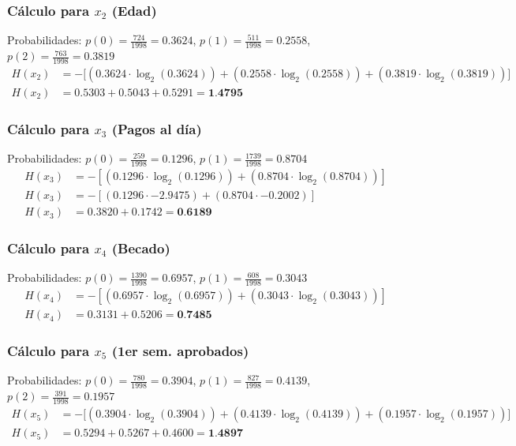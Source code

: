\documentclass[12pt,a4paper]{article}
\begin{document}
\subsubsection{Cálculo para $x_2$ (Edad)}
Probabilidades: $p(0) = \frac{724}{1998} = 0.3624$, $p(1) = \frac{511}{1998} = 0.2558$, $p(2) = \frac{763}{1998} = 0.3819$
\begin{align*}
    H(x_2) &= -\big[ (0.3624 \cdot \log_2(0.3624)) + (0.2558 \cdot \log_2(0.2558)) + (0.3819 \cdot \log_2(0.3819)) \big] \\
    H(x_2) &= 0.5303 + 0.5043 + 0.5291 = \textbf{1.4795}
\end{align*}

\subsubsection{Cálculo para $x_3$ (Pagos al día)}
Probabilidades: $p(0) = \frac{259}{1998} = 0.1296$, $p(1) = \frac{1739}{1998} = 0.8704$
\begin{align*}
    H(x_3) &= -\left[ (0.1296 \cdot \log_2(0.1296)) + (0.8704 \cdot \log_2(0.8704)) \right] \\
    H(x_3) &= -\left[ (0.1296 \cdot -2.9475) + (0.8704 \cdot -0.2002) \right] \\
    H(x_3) &= 0.3820 + 0.1742 = \textbf{0.6189}
\end{align*}

\subsubsection{Cálculo para $x_4$ (Becado)}
Probabilidades: $p(0) = \frac{1390}{1998} = 0.6957$, $p(1) = \frac{608}{1998} = 0.3043$
\begin{align*}
    H(x_4) &= -\left[ (0.6957 \cdot \log_2(0.6957)) + (0.3043 \cdot \log_2(0.3043)) \right] \\
    H(x_4) &= 0.3131 + 0.5206 = \textbf{0.7485}
\end{align*}

\subsubsection{Cálculo para $x_5$ (1er sem. aprobados)}
Probabilidades: $p(0) = \frac{780}{1998} = 0.3904$, $p(1) = \frac{827}{1998} = 0.4139$, $p(2) = \frac{391}{1998} = 0.1957$
\begin{align*}
    H(x_5) &= -\big[ (0.3904 \cdot \log_2(0.3904)) + (0.4139 \cdot \log_2(0.4139)) + (0.1957 \cdot \log_2(0.1957)) \big] \\
    H(x_5) &= 0.5294 + 0.5267 + 0.4600 = \textbf{1.4897}
\end{align*}
\end{document}
